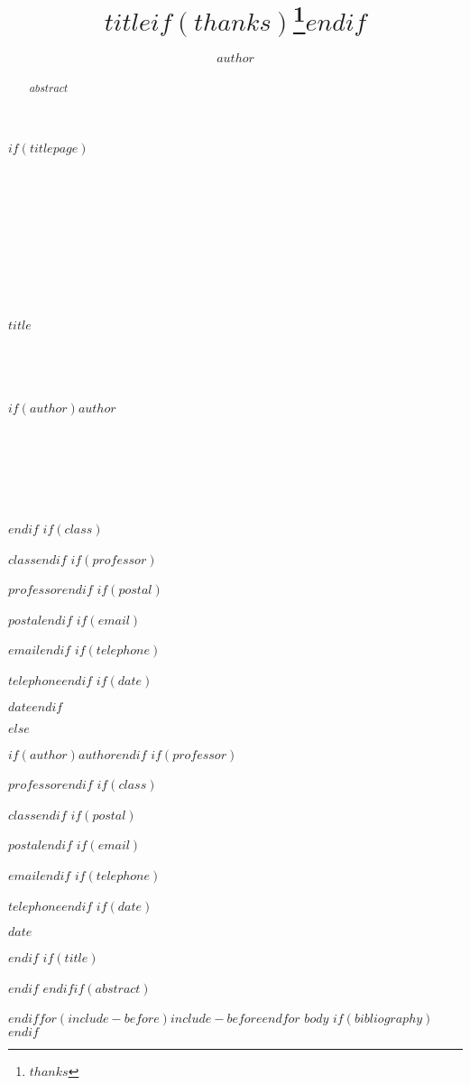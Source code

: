 \documentclass[12pt]{article}
\title{$title$$if(thanks)$\thanks{$thanks$}$endif$}
\author{$author$}
\newenvironment{titling}
  {\par}
  {\par}
\newenvironment{mlaheader}{
  \begingroup%
  \rmfamily%
  \fontsize{12}{2}%
  \setlength{\parindent}{0pt}
}{%
  \endgroup%
}
\newcommand*{\makeheader}{%
  \begin{mlaheader}
    $if(author)$\noindent $author$$endif$
    $if(professor)$\par\noindent $professor$$endif$
    $if(class)$\par\noindent $class$$endif$
    $if(postal)$\par\noindent $postal$$endif$
    $if(email)$\par\noindent $email$$endif$
    $if(telephone)$\par\noindent $telephone$$endif$
    $if(date)$\par\noindent $date$\par$endif$
  \end{mlaheader}
  $if(title)$\par\mlatitle\par$endif$
}
\newcommand*{\mlatitlespec}{
    \begin{titling}
        \par\mbox{ }\par\mbox{ }\par\mbox{ }\par\mbox{ }\par\mbox{ }\par
        $title$
        \par\mbox{ }\par\mbox{ }\par
        $if(author)$$author$\par\mbox{ }\par\mbox{ }\par\mbox{ }\par$endif$
        $if(class)$\par\noindent $class$$endif$
        $if(professor)$\par\noindent $professor$$endif$
        $if(postal)$\par\noindent $postal$$endif$
        $if(email)$\par\noindent $email$$endif$
        $if(telephone)$\par\noindent $telephone$$endif$
        $if(date)$\par\noindent $date$$endif$
	\end{titling}}
\newcommand*{\mlatitlepage}{%
  \setcounter{page}{0}
  \thispagestyle{empty}
  \hspace{0pt}
  \vfill
    \mlatitlespec 
  \vfill
  \hspace{0pt}
  \secondtitle
  \par
}}
\begin{document}
$if(titlepage)$\mlatitlepage$else$\makeheader$endif$$if(abstract)$\begin{abstract}$abstract$\end{abstract}$endif$$for(include-before)$$include-before$$endfor$
$body$%
$if(bibliography)$\mlaworkscited$endif$
\end{document}
